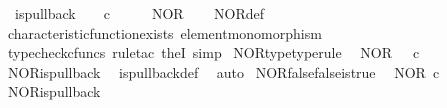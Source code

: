 \begin{isabellebody}
\ \ {\isachardoublequoteopen}is{\isacharunderscore}{\kern0pt}pullback\ \ {\isasymone}\ {\isasymone}\ {\isacharparenleft}{\kern0pt}{\isasymOmega}{\isasymtimes}\isactrlsub c{\isasymOmega}{\isacharparenright}{\kern0pt}\ {\isasymOmega}\ {\isacharparenleft}{\kern0pt}{\isasymbeta}\isactrlbsub {\isasymone}\isactrlesub {\isacharparenright}{\kern0pt}\ {\isasymt}\ {\isasymlangle}{\isasymf}{\isacharcomma}{\kern0pt}\ {\isasymf}{\isasymrangle}\ NOR{\isachardoublequoteclose}\isanewline
%
\isadelimproof
\ \ %
\endisadelimproof
%
\isatagproof
{}\isamarkupfalse%
\ NOR{\isacharunderscore}{\kern0pt}def\isanewline
\ \ \isamarkupfalse%
\ characteristic{\isacharunderscore}{\kern0pt}function{\isacharunderscore}{\kern0pt}exists\ element{\isacharunderscore}{\kern0pt}monomorphism\isanewline
\ \ \isamarkupfalse%
\ {\isacharparenleft}{\kern0pt}typecheck{\isacharunderscore}{\kern0pt}cfuncs{\isacharcomma}{\kern0pt}\ rule{\isacharunderscore}{\kern0pt}tac\ the{}I{}{\isacharcomma}{\kern0pt}\ simp{\isacharparenright}{\kern0pt}%
\endisatagproof
{\isafoldproof}%
%
\isadelimproof
\isanewline
%
\endisadelimproof
\isanewline
{}\isamarkupfalse%
\ NOR{\isacharunderscore}{\kern0pt}type{\isacharbrackleft}{\kern0pt}type{\isacharunderscore}{\kern0pt}rule{\isacharbrackright}{\kern0pt}{\isacharcolon}{\kern0pt}\isanewline
\ \ {\isachardoublequoteopen}NOR\ {\isacharcolon}{\kern0pt}\ {\isasymOmega}\ {\isasymtimes}\isactrlsub c\ {\isasymOmega}\ {\isasymrightarrow}\ {\isasymOmega}{\isachardoublequoteclose}\isanewline
%
\isadelimproof
\ \ %
\endisadelimproof
%
\isatagproof
{}\isamarkupfalse%
\ NOR{\isacharunderscore}{\kern0pt}is{\isacharunderscore}{\kern0pt}pullback\ \isamarkupfalse%
\ is{\isacharunderscore}{\kern0pt}pullback{\isacharunderscore}{\kern0pt}def\ \isamarkupfalse%
\ auto%
\endisatagproof
{\isafoldproof}%
%
\isadelimproof
\isanewline
%
\endisadelimproof
\isanewline
{}\isamarkupfalse%
\ NOR{\isacharunderscore}{\kern0pt}false{\isacharunderscore}{\kern0pt}false{\isacharunderscore}{\kern0pt}is{\isacharunderscore}{\kern0pt}true{\isacharcolon}{\kern0pt}\isanewline
\ \ {\isachardoublequoteopen}NOR\ {\isasymcirc}\isactrlsub c\ {\isasymlangle}{\isasymf}{\isacharcomma}{\kern0pt}{\isasymf}{\isasymrangle}\ {\isacharequal}{\kern0pt}\ {\isasymt}{\isachardoublequoteclose}\isanewline
%
\isadelimproof
\ \ %
\endisadelimproof
%
\isatagproof
{}\isamarkupfalse%
\ NOR{\isacharunderscore}{\kern0pt}is{\isacharunderscore}{\kern0pt}pullback\ \isamarkupfalse%

\end{isabellebody}

